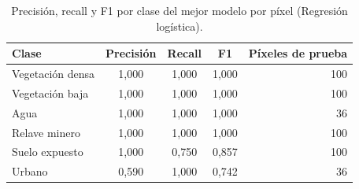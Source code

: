 \begin{table}[htbp]
 \centering
 \caption{Precisión, recall y F1 por clase del mejor modelo por píxel (Regresión logística).}
 \label{tab:por_clase}
 \begin{tabular}{lcccr}
  \toprule
  Clase & Precisión & Recall & F1 & Píxeles de prueba \\
  \midrule
  Vegetación densa & 1{,}000 & 1{,}000 & 1{,}000 & 100 \\
  Vegetación baja & 1{,}000 & 1{,}000 & 1{,}000 & 100 \\
  Agua & 1{,}000 & 1{,}000 & 1{,}000 & 36 \\
  Relave minero & 1{,}000 & 1{,}000 & 1{,}000 & 100 \\
  Suelo expuesto & 1{,}000 & 0{,}750 & 0{,}857 & 100 \\
  Urbano & 0{,}590 & 1{,}000 & 0{,}742 & 36 \\
  \bottomrule
 \end{tabular}
\end{table}
